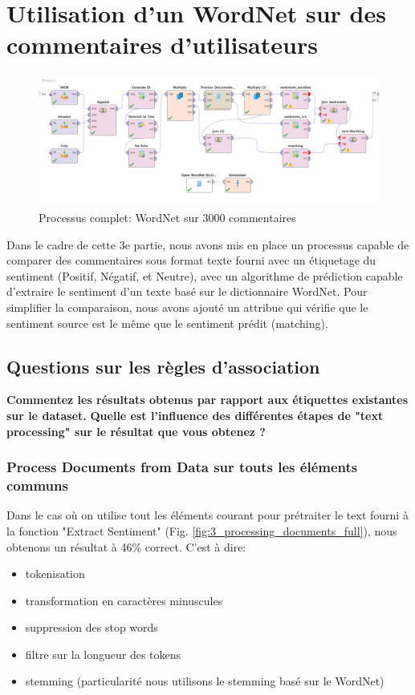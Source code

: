 \documentclass[a4paper]{article}
\begin{document}
\section{Utilisation d'un WordNet sur des commentaires d'utilisateurs}

\begin{figure}[H]
	\includegraphics[width=\linewidth]{imgs/part_3/3_full_process}
	\caption{Processus complet: WordNet sur 3000 commentaires }
	\label{fig:3_full_process}
\end{figure}

Dans le cadre de cette 3e partie, nous avons mis en place un processus capable de comparer des commentaires sous format texte fourni avec un étiquetage du sentiment (Positif, Négatif, et Neutre), avec un algorithme de prédiction capable d'extraire le sentiment d'un texte basé sur le dictionnaire WordNet. Pour simplifier la comparaison, nous avons ajouté un attribue qui vérifie que le sentiment source est le même que le sentiment prédit (matching).

\subsection{Questions sur les règles d'association}

\textbf{Commentez les résultats obtenus par rapport aux étiquettes existantes sur le dataset.}
\textbf{Quelle est l'influence des différentes étapes de "text processing" sur le résultat que vous obtenez ?}

\subsubsection{Process Documents from Data sur touts les éléments communs}
Dans le cas où on utilise tout les éléments courant pour prétraiter le text fourni à la fonction "Extract Sentiment" (Fig. \ref{fig:3_processing_documents_full}), nous obtenons un résultat à 46\% correct.
C'est à dire:
\begin{itemize}
	\item tokenisation
	\item transformation en caractères minuscules
	\item suppression des stop words
	\item filtre sur la longueur des tokens
	\item stemming (particularité nous utilisons le stemming basé sur le WordNet)
\end{itemize}
\end{document}
